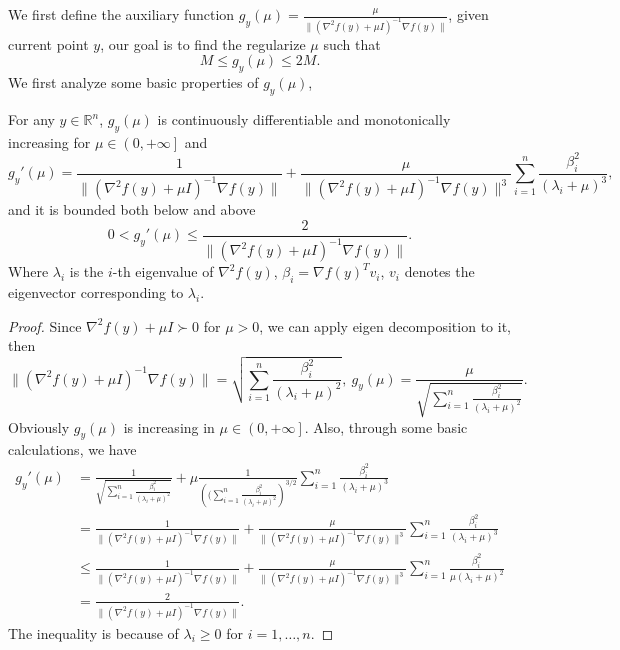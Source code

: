 \documentclass{article}
\begin{document}
We first define the auxiliary function $g_y(\mu) = \frac{\mu}{\|\left (\nabla^2 f(y)+\mu I\right)^{-1}\nabla f(y)\|}$, given current point $y$, our goal is to find the regularize $\mu$ such that 
\begin{equation*}
    M \leq g_y(\mu) \leq 2M.
\end{equation*}
We first analyze some basic properties of $g_y(\mu)$,
\begin{lemma}
    \label{lem.property g}
    For any $y\in \mathbb{R}^n$, $g_y(\mu)$ is continuously differentiable and monotonically increasing for $\mu \in \left (0,+\infty\right ]$ and
    \begin{equation}
        \label{eq.derivative}
        g_y'(\mu) = \frac{1}{\|\left (\nabla ^2 f(y)+\mu I \right)^{-1}\nabla f(y)\|}+\frac{\mu}{\|\left (\nabla ^2 f(y)+\mu I \right)^{-1}\nabla f(y)\|^3}\sum_{i=1}^n\frac{\beta_i^2}{\left (\lambda_i+\mu\right )^3},
    \end{equation}
    and it is bounded both below and above
    \begin{equation}
        \label{eq.derivative bound}
        0< g_y'(\mu) \leq \frac{2}{\|\left (\nabla ^2 f(y)+\mu I \right)^{-1}\nabla f(y)\|}.
    \end{equation}
    Where $\lambda_i$ is the $i$-th eigenvalue of $\nabla ^2 f(y)$, $\beta_i = \nabla f(y)^T v_i$, $v_i$ denotes the eigenvector corresponding to $\lambda_i$.
\end{lemma}
\begin{proof}
    Since $\nabla^2 f(y)+\mu I \succ 0$ for $\mu>0$, we can apply eigen decomposition to it, then 
    \begin{equation*}
        \|\left (\nabla ^2 f(y)+\mu I \right)^{-1}\nabla f(y)\|=\sqrt{\sum_{i=1}^n \frac{\beta_i^2}{\left (\lambda_i+\mu\right )^2}}, \ g_y(\mu) = \frac{\mu}{\sqrt{\sum_{i=1}^n \frac{\beta_i^2}{\left (\lambda_i+\mu\right )^2}}}.
    \end{equation*}
    Obviously $g_y(\mu)$ is increasing in $\mu \in \left (0,+\infty\right ]$. Also, through some basic calculations, we have
    \begin{equation*}
        \begin{aligned}
            g_y'(\mu) &= \frac{1}{\sqrt{\sum_{i=1}^n \frac{\beta_i^2}{\left (\lambda_i+\mu\right )^2}}}+\mu \frac{1}{\left ( (\sum_{i=1}^n \frac{\beta_i^2}{\left (\lambda_i+\mu\right )^2}\right )^{3/2}}\sum_{i=1}^n\frac{\beta_i^2}{\left (\lambda_i+\mu\right )^3}\\
            &= \frac{1}{\|\left (\nabla ^2 f(y)+\mu I \right)^{-1}\nabla f(y)\|}+\frac{\mu}{\|\left (\nabla ^2 f(y)+\mu I \right)^{-1}\nabla f(y)\|^3}\sum_{i=1}^n\frac{\beta_i^2}{\left (\lambda_i+\mu\right )^3}\\
            &\leq \frac{1}{\|\left (\nabla ^2 f(y)+\mu I \right)^{-1}\nabla f(y)\|}+\frac{\mu}{\|\left (\nabla ^2 f(y)+\mu I \right)^{-1}\nabla f(y)\|^3}\sum_{i=1}^n\frac{\beta_i^2}{\mu\left (\lambda_i+\mu\right )^2}\\
            &=  \frac{2}{\|\left (\nabla ^2 f(y)+\mu I \right)^{-1}\nabla f(y)\|}.
        \end{aligned}
    \end{equation*}
    The inequality is because of $\lambda_i \geq 0$ for $i=1,\ldots,n$.
\end{proof}
\end{document}
